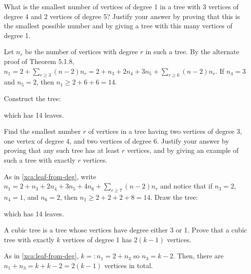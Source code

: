 \documentclass[class=math239,notes,tikz]{agony}
\begin{document}
\begin{xca}\label{xca:leaf-from-deg}
  What is the smallest number of vertices of degree 1 in a tree
  with 3 vertices of degree 4 and 2 vertices of degree 5?
  Justify your answer by proving that this is the smallest possible number
  and by giving a tree with this many vertices of degree 1.
\end{xca}
\begin{sol}
  Let $n_r$ be the number of vertices with degree $r$ in such a tree.
  By the alternate proof of Theorem 5.1.8,
  $n_1 = 2 + \sum_{r \geq 3}(n-2)n_r = 2 + n_3 + 2n_4 + 3n_5 + \sum_{r \geq 6}(n-2)n_r$.
  If $n_4 = 3$ and $n_5 = 2$, then $n_1 \geq 2 + 6 + 6 = 14$.

  Construct the tree:
  \begin{center}
  \end{center}
  which has 14 leaves.
\end{sol}

\begin{xca}
  Find the smallest number $r$ of vertices in a tree having
  two vertices of degree 3, one vertex of degree 4, and two vertices of degree 6.
  Justify your answer by proving that any such tree has at least $r$ vertices,
  and by giving an example of such a tree with exactly $r$ vertices.
\end{xca}
\begin{sol}
  As in \cref{xca:leaf-from-deg}, write $n_1 = 2 + n_3 + 2n_4 + 3n_5 + 4n_6 + \sum_{r \geq 7}(n-2)n_r$
  and notice that if $n_3 = 2$, $n_4 = 1$, and $n_6 = 2$,
  then $n_1 \geq 2 + 2 + 2 + 8 = 14$.
  Draw the tree:
  \begin{center}
  \end{center}
  which has 14 leaves.
\end{sol}

\begin{xca}
  A cubic tree is a tree whose vertices have degree either 3 or 1.
  Prove that a cubic tree with exactly $k$ vertices of degree 1
  has $2(k - 1)$ vertices.
\end{xca}
\begin{prf}
  As in \cref{xca:leaf-from-deg}, $k =: n_1 = 2 + n_3$ so $n_3 = k - 2$.
  Then, there are $n_1 + n_3 = k + k - 2 = 2(k-1)$ vertices in total.
\end{prf}
\end{document}
